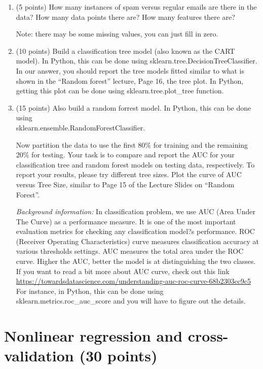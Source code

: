 \documentclass[twoside,10pt]{article}
\begin{document}
\begin{enumerate}

\item (5 points) How many instances of spam versus regular emails are there in the data? How many data points there are? How many features there are?

Note: there may be some missing values, you can just fill in zero.

\item (10 points) Build a classification tree model (also known as the CART model). In Python, this can be done using \textsf{sklearn.tree.DecisionTreeClassifier}. In our answer, you should report the tree models fitted similar to what is shown in the ``Random forest'' lecture, Page 16, the tree plot. In Python, getting this plot can be done using \textsf{sklearn.tree.plot\_tree} function. 

\item (15 points)
Also build a random forrest model. In Python, this can be done using\\ \textsf{sklearn.ensemble.RandomForestClassifier}. 

Now partition the data to use the first 80\% for training and the remaining 20\% for testing. Your task is to compare and report the AUC  for your classification tree and random forest models on testing data, respectively. To report your results, please try different tree sizes. Plot the curve of AUC versus Tree Size, similar to Page 15 of the Lecture Slides on ``Random Forest''. 


{\it Background information:} In classification problem, we use AUC (Area Under The Curve) as a performance measure. It is one of the most important evaluation metrics for checking any classification model?s performance. ROC (Receiver Operating Characteristics) curve measures classification accuracy at various thresholds settings. AUC measures the total area under the ROC curve. Higher the AUC, better the model is at distinguishing the two classes. If you want to read a bit more about AUC curve, check out this link \url{https://towardsdatascience.com/understanding-auc-roc-curve-68b2303cc9c5} For instance, in Python, this can be done using \textsf{sklearn.metrics.roc\_auc\_score} and you will have to figure out the details. 

\end{enumerate}


\section{Nonlinear regression and cross-validation (30 points)}
\end{document}
